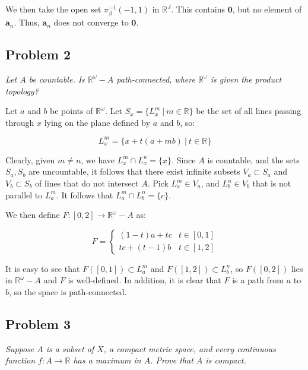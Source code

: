 \documentclass[10pt, oneside]{amsart}
\newcommand{\bm}{\boldsymbol}
\begin{document}
    We then take the open set $\pi^{-1}_{\beta}(-1, 1)$ in $\mathbb{R}^{J}$. This contains $\bm{0}$, but no element of $\bm{a}_n$. Thus, $\bm{a}_n$ does not converge to $\bm{0}$.

    \hrulefill

    \subsection{Problem 2} \textit{Let $A$ be countable. Is $\mathbb{R}^{\omega} - A$ path-connected, where $\mathbb{R}^{\omega}$ is given the product topology?}
    \newline

    Let $a$ and $b$ be points of $\mathbb{R}^{\omega}$. Let $S_x = \{ L_{x}^{m} \ | \ m \in \mathbb{R} \}$ be the set of all lines passing through $x$ lying on the plane defined by $a$ and $b$, so:

    $$L_x^{m} = \{ x + t(a + mb) \ | \ t \in \mathbb{R} \}$$

    Clearly, given $m \neq n$, we have $L_x^{m} \cap L_x^{n} = \{x\}$. Since $A$ is countable, and the sets $S_a, S_b$ are uncountable, it follows that there exist infinite
    subsets $V_a \subset S_a$ and $V_b \subset S_b$ of lines that do not intersect $A$. Pick $L_a^{m} \in V_a$, and $L_b^{n} \in V_b$ that is not parallel to $L_a^{m}$. It follows that $L_a^{m} \cap L_b^{n} = \{c\}$.
    \newline

    We then define $F : [0, 2] \rightarrow \mathbb{R}^{\omega} - A$ as:

    $$F = \begin{cases}
      (1 - t)a + tc & t \in \left[ 0, 1 \right] \\
      t c + (t - 1)b & t \in \left[ 1, 2 \right]
    \end{cases}
    $$

    It is easy to see that $F([0, 1]) \subset L_a^{m}$ and $F([1, 2]) \subset L_b^{n}$, so $F([0, 2])$ lies in $\mathbb{R}^{\omega} - A$ and $F$ is well-defined. In addition, it is clear that
    $F$ is a path from $a$ to $b$, so the space is path-connected.

    \hrulefill

    \subsection{Problem 3} \textit{Suppose $A$ is a subset of $X$, a compact metric space, and every continuous function $f : A \rightarrow \mathbb{R}$ has a maximum in $A$. Prove that $A$ is compact.}
    \newline
\end{document}
